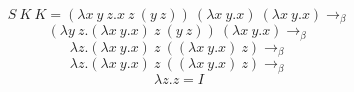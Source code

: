 \documentclass[12pt]{article}
\begin{document}
$$S\ K\ K = (\lambda x\ y\ z.x\ z\ (y\ z))\ (\lambda x\ y.x)\ (\lambda x\ y.x) \rightarrow_\beta$$
$$(\lambda y\ z.(\lambda x\ y.x)\ z\ (y\ z))\ (\lambda x\ y.x) \rightarrow_\beta$$
$$\lambda z.(\lambda x\ y.x)\ z\ ((\lambda x\ y.x)\ z) \rightarrow_\beta$$
$$\lambda z.(\lambda x\ y.x)\ z\ ((\lambda x\ y.x)\ z) \rightarrow_\beta$$
$$\lambda z.z = I$$
\end{document}
